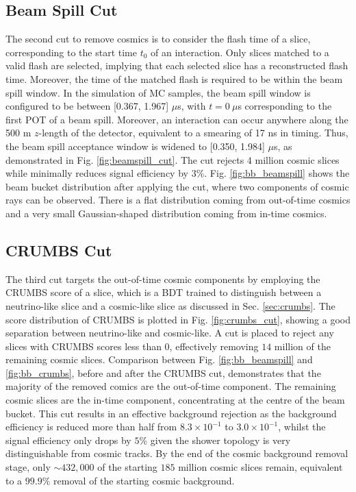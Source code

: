 \subsection{Beam Spill Cut}

The second cut to remove cosmics is to consider the flash time of a slice, corresponding to the start time $t_0$ of an interaction. 
Only slices matched to a valid flash are selected, implying that each selected slice has a reconstructed flash time.
Moreover, the time of the matched flash is required to be within the beam spill window.
In the simulation of MC samples, the beam spill window is configured to be between [0.367, 1.967] $\mu$s, with $t = 0\ \mu$s corresponding to the first POT of a beam spill.
Moreover, an interaction can occur anywhere along the 500 m $z$-length of the detector, equivalent to a smearing of 17 ns in timing.
Thus, the beam spill acceptance window is widened to [0.350, 1.984] $\mu$s, as demonstrated in Fig. \ref{fig:beamspill_cut}.
The cut rejects $4$ million cosmic slices while minimally reduces signal efficiency by $3\%$.
Fig. \ref{fig:bb_beamspill} shows the beam bucket distribution after applying the cut, where two components of cosmic rays can be observed.
There is a flat distribution coming from out-of-time cosmics and a very small Gaussian-shaped distribution coming from in-time cosmics.

\subsection{CRUMBS Cut}

The third cut targets the out-of-time cosmic components by employing the CRUMBS score of a slice, which is a BDT trained to distinguish between a neutrino-like slice and a cosmic-like slice as discussed in Sec. \ref{sec:crumbs}.                                                                                       
The score distribution of CRUMBS is plotted in Fig. \ref{fig:crumbs_cut}, showing a good separation between neutrino-like and cosmic-like.                                                                        
A cut is placed to reject any slices with CRUMBS scores less than 0, effectively removing $14$ million of the remaining cosmic slices.
Comparison between Fig. \ref{fig:bb_beamspill} and \ref{fig:bb_crumbs}, before and after the CRUMBS cut, demonstrates that the majority of the removed comics are the out-of-time component. 
The remaining cosmic slices are the in-time component, concentrating at the centre of the beam bucket.  
This cut results in an effective background rejection as the background efficiency is reduced more than half from $8.3 \times 10^{-1}$ to $3.0 \times 10^{-1}$, whilst the signal efficiency only drops by $5 \%$ given the shower topology is very distinguishable from cosmic tracks.
By the end of the cosmic background removal stage, only $\sim432,000$ of the starting $185$ million cosmic slices remain, equivalent to a $99.9\%$ removal of the starting cosmic background.


